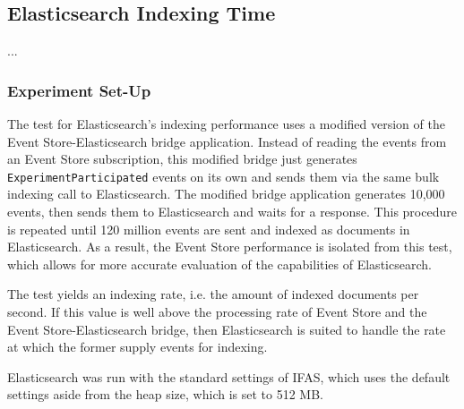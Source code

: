 \subsection{Elasticsearch Indexing Time}
\label{subsec:evaluation:performance:elasticsearch}

...

\subsubsection{Experiment Set-Up}

The test for Elasticsearch's indexing performance uses a modified version of the Event Store-Elasticsearch bridge application.
Instead of reading the events from an Event Store subscription, this modified bridge just generates \texttt{ExperimentParticipated} events on its own and sends them via the same bulk indexing call to Elasticsearch.
The modified bridge application generates 10,000 events, then sends them to Elasticsearch and waits for a response.
This procedure is repeated until 120 million events are sent and indexed as documents in Elasticsearch.
As a result, the Event Store performance is isolated from this test, which allows for more accurate evaluation of the capabilities of Elasticsearch.

The test yields an indexing rate, i.e. the amount of indexed documents per second.
If this value is well above the processing rate of Event Store and the Event Store-Elasticsearch bridge, then Elasticsearch is suited to handle the rate at which the former supply events for indexing.

Elasticsearch was run with the standard settings of \ac{IFAS}, which uses the default settings aside from the heap size, which is set to 512 MB.



